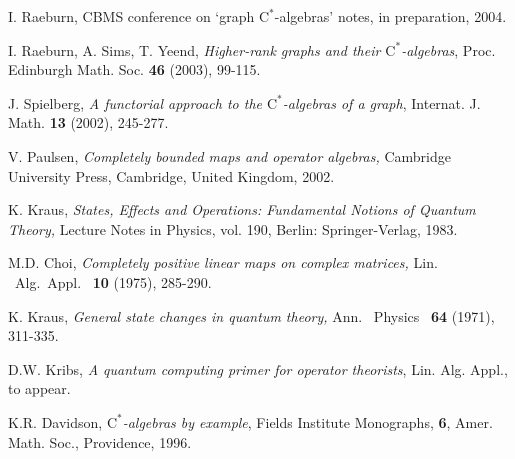 \documentclass[12pt]{amsart}
\theoremstyle{plain}
\theoremstyle{definition}
\newcommand{\ca}{\mathrm{C}^*}
\begin{document}
\begin{thebibliography}{99}
 I. Raeburn,
CBMS conference on `graph $\ca$-algebras' notes, in preparation,
2004.

 I. Raeburn, A. Sims, T. Yeend,
\textit{Higher-rank graphs and their $\ca$-algebras}, Proc.
Edinburgh Math. Soc. {\bf 46} (2003), 99-115.


 J. Spielberg,
\textit{A functorial approach to the $\ca$-algebras of a graph},
Internat. J. Math. {\bf 13} (2002), 245-277.


 V. Paulsen,
\textit{Completely bounded maps and operator algebras,} Cambridge
University Press, Cambridge, United Kingdom, 2002.

 K. Kraus,
\textit{States, Effects and Operations: Fundamental Notions of
Quantum Theory,} Lecture Notes in Physics, vol. 190, Berlin:
Springer-Verlag, 1983.

 M.D. Choi,
\textit{Completely positive linear maps on complex matrices,} Lin.
\ Alg.\ Appl. \ \textbf{10} (1975), 285-290.

 K. Kraus,
\textit{General state changes in quantum theory,} Ann. \ Physics \
\textbf{64} (1971), 311-335.

 D.W. Kribs,
\textit{A quantum computing primer for operator theorists}, Lin.
Alg. Appl., to appear.

 K.R. Davidson,
\textit{$\ca$-algebras by example}, Fields Institute Monographs,
{\bf 6}, Amer. Math. Soc., Providence, 1996.

\end{thebibliography}
\end{document}
